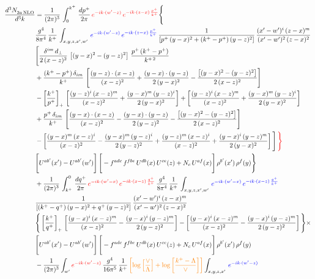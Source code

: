 \documentclass[9pt]{article}
\numberwithin{equation}{section}
\begin{document}
\begin{align}
    \frac{d^{3}N_{2a\,\rm NLO}^{\rm}}{d^{3}k}  & =  \frac{1}{(2\pi)^{3}}\,\int_{0}^{k^{+}}\, \frac{dp^{+}}{2\pi} \, {\color{red}e^{-ik\cdot(w'-z)}\,e^{-ik\cdot (z-x)\,\frac{p^{+}}{k^{+}}}} \Bigg\{\notag \\ & \frac{g^{4}}{8\pi^{4}}\,\frac{1}{k^{+}}\,\int_{x,y,z,x',w'}\,{\color{blue}e^{-ik\cdot(w'-z)}\,e^{-ik\cdot (z-x)\,\frac{p^{+}}{k^{+}}}}\,\frac{1}{\left[p^{+}\,(y-x)^{2}+(k^{+}-p^{+})\,(y-z)^{2}\right]}\, \frac{(x'-w')^{i}\,(z-x)^{m}}{(x'-w')^{2}\,(z-x)^{2}} \notag \\ & \Bigg[\frac{\delta^{im}\,d_{\perp}}{2\,(x-z)^{2}}\,\left[(y-x)^{2}-(y-z)^{2}\right]\,\frac{p^{+}\,(k^{+}-p^{+})}{k^{+\,2}}\notag \\ & +\frac{(k^{+}-p^{+})\,\delta_{im}}{k^{+}}\,\left[\frac{(y-z)\cdot (x-z)}{(x-z)^{2}}+\frac{(y-x)\cdot (y-z)}{2\,(y-x)^{2}}-\frac{\left[(y-x)^{2}-(y-z)^{2}\right]}{2\,(x-z)^{2}}\right]\notag \\ & -\left[\frac{k^{+}}{p^{+}}\right]_{+}\,\left[\frac{(y-z)^{i}\,(x-z)^{m}}{(x-z)^{2}}+\frac{(y-x)^{m}\,(y-z)^{i}}{2\,(y-x)^{2}}\right]+ \left[\frac{(y-z)^{i}\,(x-z)^{m}}{(x-z)^{2}}+\frac{(y-x)^{m}\,(y-z)^{i}}{2\,(y-x)^{2}}\right]\notag \\ & +\frac{p^{+}\,\delta_{im}}{k^{+}}\,\left[\frac{(y-x)\cdot (x-z)}{(x-z)^{2}}-\frac{(y-x)\cdot (y-z)}{2\,(y-z)^{2}}-\frac{\left[(y-x)^{2}-(y-z)^{2}\right]}{2\,(x-z)^{2}}\right]\notag \\ &-\left[\frac{(y-x)^{m}\,(x-z)^{i}}{(x-z)^{2}}-\frac{(y-x)^{m}\,(y-z)^{i}}{2\,(y-z)^{2}}+\frac{(y-z)^{m}\,(x-z)^{i}}{(x-z)^{2}}+\frac{(y-x)^{i}\,(y-z)^{m}}{2\,(y-x)^{2}}\right]\Bigg]\,{\color{red}\Bigg\}} \notag \\ & \Bigg[U^{ab'}(x')-U^{ab'}(w')\Bigg]\,\Bigg[-f^{adc}\,f^{fbe}\,U^{db}(x)\,U^{ce}(z)+N_{c}\,U^{af}(x)\Bigg]\,\rho^{b'}(x')\,\rho^{f}(y)\Bigg\}\notag \\ & + \frac{1}{(2\pi)^{3}}\,\int^{0}_{k^{+}}\, \frac{dq^{+}}{2\pi} \, {\color{red}e^{-ik\cdot(w'-x)}\,e^{-ik\cdot (x-z)\,\frac{q^{+}}{k^{+}}}}\, \frac{g^{4}}{8\pi^{4}}\,\frac{1}{k^{+}}\, \int_{x,y,z,x',w'}\,{\color{blue}e^{-ik\cdot(w'-x)}\,e^{-ik\cdot (x-z)\,\frac{q^{+}}{k^{+}}}}\notag \\ & \frac{1}{\left[(k^{+}-q^{+})\,(y-x)^{2}+q^{+}\,(y-z)^{2}\right]}\, \frac{(x'-w')^{i}\,(z-x)^{m}}{(x'-w')^{2}\,(z-x)^{2}} \notag \\ &\Bigg\{\left[\frac{k^{+}}{q^{+}}\right]_{+}\,\left[\frac{(y-x)^{i}\,(x-z)^{m}}{(x-z)^{2}}-\frac{(y-x)^{i}\,(y-z)^{m}}{2\,(y-z)^{2}}\right] -\left[\frac{(y-x)^{i}\,(x-z)^{m}}{(x-z)^{2}}-\frac{(y-x)^{i}\,(y-z)^{m}}{2\,(y-z)^{2}}\right]\Bigg\}\times\,\notag \\ & \Bigg[U^{ab'}(x')-U^{ab'}(w')\Bigg]\,\Bigg[-f^{adc}\,f^{fbe}\,U^{db}(x)\,U^{ce}(z)+N_{c}\,U^{af}(x)\Bigg]\,\rho^{b'}(x')\,\rho^{f}(y)\notag \\ & - \frac{1}{(2\pi)^{3}}  \int_{w^\prime} {\color{red}e^{-ik\cdot(w'-z)}}\, \frac{g^{4}}{16\pi^{5}}\,\frac{1}{k^{+}}\,{\color{orange}\left[\log{\left[\frac{\vee}{\Lambda}\right]}+\log{\left[\frac{k^{+}-\Lambda}{\vee}\right]}\right]} \int_{x,y,z,x'}\, {\color{blue}e^{-ik\cdot(w'-z)}}\notag \\ & 
\end{align}
\end{document}
